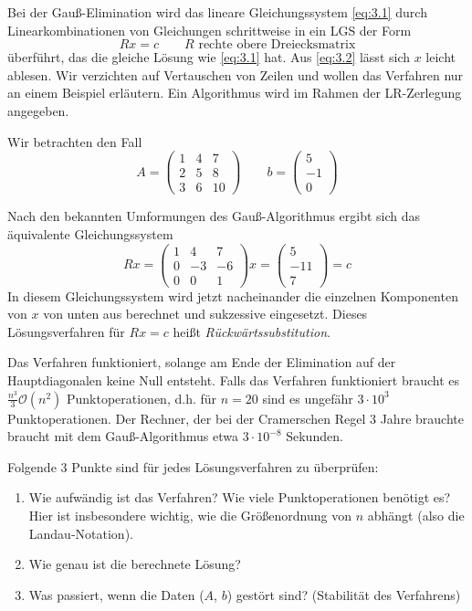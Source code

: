 \documentclass[a4paper]{scrartcl}
\numberwithin{equation}{section}
\begin{document}
\begin{ex}
\label{ex:3.2}
Bei der Gauß-Elimination wird das lineare Gleichungssystem \eqref{eq:3.1} durch Linearkombinationen von Gleichungen schrittweise in ein LGS der Form
\begin{equation}
\label{eq:3.2}
Rx=c \qquad R\text{ rechte obere Dreiecksmatrix}
\end{equation}
überführt, das die gleiche Lösung wie \eqref{eq:3.1} hat.
Aus \eqref{eq:3.2} lässt sich $x$ leicht ablesen.
Wir verzichten auf Vertauschen von Zeilen und wollen das Verfahren nur an einem Beispiel erläutern.
Ein Algorithmus wird im Rahmen der LR-Zerlegung angegeben.

Wir betrachten den Fall
\[
A=\begin{pmatrix}1&4&7\\ 2&5&8\\ 3&6&10\end{pmatrix} \qquad b=\begin{pmatrix} 5\\-1\\ 0\end{pmatrix}
\]

Nach den bekannten Umformungen des Gauß-Algorithmus ergibt sich das äquivalente Gleichungssystem
\[
Rx= \begin{pmatrix} 1&4&7\\0&-3&-6\\ 0&0&1\end{pmatrix}
x= \begin{pmatrix} 5\\-11\\7\end{pmatrix} = c
\]
In diesem Gleichungssystem wird jetzt nacheinander die einzelnen Komponenten von $x$ von unten aus berechnet und sukzessive eingesetzt.
Dieses Lösungsverfahren für $Rx=c$ heißt \emph{Rückwärtssubstitution}.

Das Verfahren funktioniert, solange am Ende der Elimination auf der Hauptdiagonalen keine Null entsteht.
Falls das Verfahren funktioniert braucht es $\frac{n^3}3\mathcal O(n^2)$ Punktoperationen, d.h. für $n=20$ sind es ungefähr
$3\cdot 10^3$ Punktoperationen. Der Rechner, der bei der Cramerschen Regel 3 Jahre brauchte braucht mit dem Gauß-Algorithmus etwa $3\cdot 10^{-8}$ Sekunden.

Folgende 3 Punkte sind für jedes Lösungsverfahren zu überprüfen:
\begin{enumerate}
\item Wie aufwändig ist das Verfahren?
Wie viele Punktoperationen benötigt es?
Hier ist insbesondere wichtig, wie die Größenordnung von $n$ abhängt (also die Landau-Notation).
\item Wie genau ist die berechnete Lösung?
\item Was passiert, wenn die Daten ($A$, $b$) gestört sind? (Stabilität des Verfahrens)
\end{enumerate}
\end{ex}
\end{document}
